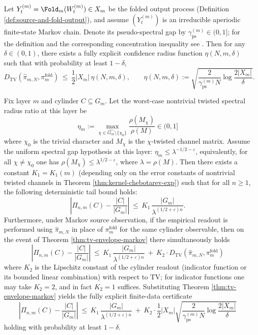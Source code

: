 \begin{theorem}\label{thm:tv-envelope-markov}
Let \(Y_t^{(m)}=\Fold_m(W_t^{(m)})\in X_m\) be the folded output process (Definition \ref{def:source-and-fold-output}), and assume \((Y_t^{(m)})\) is an irreducible aperiodic finite-state Markov chain.
Denote its pseudo-spectral gap by \(\gamma_{\mathrm{ps}}^{(m)}\in(0,1]\); for the definition and the corresponding concentration inequality see \cite{Paulin2015MarkovConcentration}.
Then for any \(\delta\in(0,1)\), there exists a fully explicit confidence radius function \(\eta(N,m,\delta)\) such that with probability at least \(1-\delta\),
\[
D_{\mathrm{TV}}(\hat{\pi}_{m,N},\pi_m^{\mathrm{fold}})
\ \le\
\frac12|X_m|\,\eta(N,m,\delta),
\qquad
\eta(N,m,\delta)
:=\sqrt{\frac{2}{\gamma_{\mathrm{ps}}^{(m)}N}\log\frac{2|X_m|}{\delta}}.
\]
\end{theorem}

\begin{theorem}\label{thm:auditable-profinite-chebotarev-finite}
Fix layer \(m\) and cylinder \(C\subseteq G_m\).
Let the worst-case nontrivial twisted spectral radius ratio at this layer be
\[
\eta_m:=\max_{\chi\in\widehat{G_m}\setminus\{\chi_0\}}\frac{\rho(M_\chi)}{\rho(M)}\in(0,1]
\]
where \(\chi_0\) is the trivial character and \(M_\chi\) is the \(\chi\)-twisted channel matrix.
Assume the uniform spectral gap hypothesis at this layer:
\(
\eta_m\le \lambda^{-1/2-\varepsilon}
\),
equivalently, for all \(\chi\ne\chi_0\) one has \(\rho(M_\chi)\le \lambda^{1/2-\varepsilon}\), where \(\lambda=\rho(M)\).
Then there exists a constant \(K_1=K_1(m)\) (depending only on the error constants of nontrivial twisted channels in Theorem \ref{thm:kernel-chebotarev-exp}) such that for all \(n\ge 1\), the following deterministic tail bound holds:
\[
\left|\Pi_{n,m}(C)-\frac{|C|}{|G_m|}\right|
\ \le\
K_1\,\frac{|G_m|}{\lambda^{(1/2+\varepsilon)n}}.
\]
Furthermore, under Markov source observation, if the empirical readout is performed using \(\hat{\pi}_{m,N}\) in place of \(\pi_m^{\mathrm{fold}}\) for the same cylinder observable, then on the event of Theorem \ref{thm:tv-envelope-markov} there simultaneously holds
\[
\boxed{\;
\left|\Pi_{n,m}(C)-\frac{|C|}{|G_m|}\right|
\ \le\
K_1\,\frac{|G_m|}{\lambda^{(1/2+\varepsilon)n}}
\ +\
K_2\cdot D_{\mathrm{TV}}(\hat{\pi}_{m,N},\pi_m^{\mathrm{fold}})
\;}
\]
where \(K_2\) is the Lipschitz constant of the cylinder readout (indicator function or its bounded linear combination) with respect to TV; for indicator functions one may take \(K_2=2\), and in fact \(K_2=1\) suffices.
Substituting Theorem \ref{thm:tv-envelope-markov} yields the fully explicit finite-data certificate
\[
\boxed{\;
\left|\Pi_{n,m}(C)-\frac{|C|}{|G_m|}\right|
\ \le\
K_1\,\frac{|G_m|}{\lambda^{(1/2+\varepsilon)n}}
\ +\
K_2\cdot \frac12|X_m|\sqrt{\frac{2}{\gamma_{\mathrm{ps}}^{(m)}N}\log\frac{2|X_m|}{\delta}}
\;}
\]
holding with probability at least \(1-\delta\).
\end{theorem}


